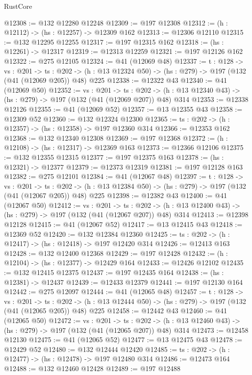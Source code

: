 \begin{lexlean}{RustCore}
\begin{coremodule}
@12308 := @132 @12280 @12248
@12309 := @197 @12308
@12312 := (h : @12112) -> (hs : @12257) -> @12309 @162
@12313 := @12306 @12110
@12315 := @132 @12295 @12255
@12317 := @197 @12315 @162
@12318 := (hs : @12261) -> @12317
@12319 := @12313 @12259
@12321 := @197 @12126 @162
@12322 := @275 @12105
@12324 := @41 (@12069 @48)
@12337 := {t : @128} ->
  {vs : @201} ->
  {ts : @202} -> (h : @13 @12324 @50) -> (hs : @279) -> @197 (@132 (@41 (@12069 @205)) @48) @225
@12338 := @12322 @43
@12340 := @41 (@12069 @50)
@12352 := {vs : @201} ->
  {ts : @202} -> (h : @13 @12340 @43) -> (hs : @279) -> @197 (@132 (@41 (@12069 @207)) @48) @314
@12353 := @12338 @12126
@12355 := @41 (@12069 @52)
@12357 := @13 @12355 @43
@12358 := @12309 @52
@12360 := @132 @12324 @12300
@12365 := {ts : @202} -> (h : @12357) -> (hs : @12358) -> @197 @12360 @314
@12366 := @12353 @162
@12368 := @132 @12340 @12308
@12369 := @197 @12368
@12372 := (h : @12108) -> (hs : @12317) -> @12369 @163
@12373 := @12366 @12106
@12375 := @132 @12355 @12315
@12377 := @197 @12375 @163
@12378 := (hs : @12321) -> @12377
@12379 := @12373 @12319
@12381 := @197 @12128 @163
@12382 := @275 @12101
@12384 := @41 (@12067 @48)
@12397 := {t : @128} ->
  {vs : @201} ->
  {ts : @202} -> (h : @13 @12384 @50) -> (hs : @279) -> @197 (@132 (@41 (@12067 @205)) @48) @225
@12398 := @12382 @43
@12400 := @41 (@12067 @50)
@12412 := {vs : @201} ->
  {ts : @202} -> (h : @13 @12400 @43) -> (hs : @279) -> @197 (@132 (@41 (@12067 @207)) @48) @314
@12413 := @12398 @12128
@12415 := @41 (@12067 @52)
@12417 := @13 @12415 @43
@12418 := @12369 @52
@12420 := @132 @12384 @12360
@12425 := {ts : @202} -> (h : @12417) -> (hs : @12418) -> @197 @12420 @314
@12426 := @12413 @163
@12428 := @132 @12400 @12368
@12429 := @197 @12428
@12432 := (h : @12104) -> (hs : @12377) -> @12429 @164
@12433 := @12426 @12102
@12435 := @132 @12415 @12375
@12437 := @197 @12435 @164
@12438 := (hs : @12381) -> @12437
@12439 := @12433 @12379
@12441 := @197 @12130 @164
@12442 := @275 @12097
@12444 := @41 (@12065 @48)
@12457 := {t : @128} ->
  {vs : @201} ->
  {ts : @202} -> (h : @13 @12444 @50) -> (hs : @279) -> @197 (@132 (@41 (@12065 @205)) @48) @225
@12458 := @12442 @43
@12460 := @41 (@12065 @50)
@12472 := {vs : @201} ->
  {ts : @202} -> (h : @13 @12460 @43) -> (hs : @279) -> @197 (@132 (@41 (@12065 @207)) @48) @314
@12473 := @12458 @12130
@12475 := @41 (@12065 @52)
@12477 := @13 @12475 @43
@12478 := @12429 @52
@12480 := @132 @12444 @12420
@12485 := {ts : @202} -> (h : @12477) -> (hs : @12478) -> @197 @12480 @314
@12486 := @12473 @164
@12488 := @132 @12460 @12428
@12489 := @197 @12488

\end{coremodule}
\end{lexlean}
